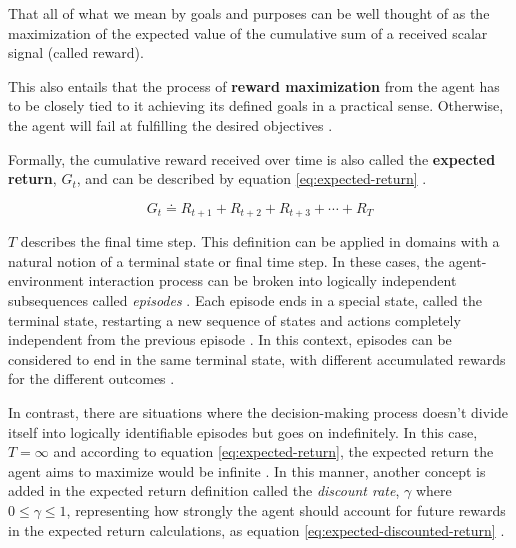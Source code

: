 \begin{displayquote}
	That all of what we mean by goals and purposes can be well thought of as the maximization of the expected value of the cumulative sum of a received scalar signal (called reward). \cite{suttonReinforcementLearningIntroduction2014}
\end{displayquote}

This also entails that the process of \textbf{reward maximization} from the agent has to be closely tied to it achieving its defined goals in a practical sense. Otherwise, the agent will fail at fulfilling the desired objectives \cite{suttonReinforcementLearningIntroduction2014}.

Formally, the cumulative reward received over time is also called the \textbf{expected return}, $G_t$, and can be described by equation \ref{eq:expected-return} \cite{suttonReinforcementLearningIntroduction2014}.

\begin{equation} \label{eq:expected-return}
	G_t \doteq R_{t+1} + R_{t+2} + R_{t+3} + \cdots + R_T
\end{equation}

$T$ describes the final time step. This definition can be applied in domains with a natural notion of a terminal state or final time step. In these cases, the agent-environment interaction process can be broken into logically independent subsequences called \textit{episodes} \cite{suttonReinforcementLearningIntroduction2014}. Each episode ends in a special state, called the terminal state, restarting a new sequence of states and actions completely independent from the previous episode \cite{suttonReinforcementLearningIntroduction2014}. In this context, episodes can be considered to end in the same terminal state, with different accumulated rewards for the different outcomes \cite{suttonReinforcementLearningIntroduction2014}.

In contrast, there are situations where the decision-making process doesn't divide itself into logically identifiable episodes but goes on indefinitely. In this case, $T = \infty$ and according to equation \ref{eq:expected-return}, the expected return the agent aims to maximize would be infinite \cite{suttonReinforcementLearningIntroduction2014}. In this manner, another concept is added in the expected return definition called the \textit{discount rate}, $\gamma$ where $0 \leq \gamma \leq 1$, representing how strongly the agent should account for future rewards in the expected return calculations, as equation \ref{eq:expected-discounted-return} \cite{suttonReinforcementLearningIntroduction2014}.

